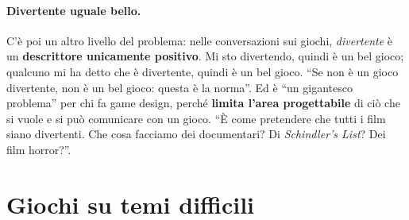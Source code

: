 \paragraph{Divertente uguale bello.} C'è poi un altro livello del problema:
nelle conversazioni sui giochi, \emph{divertente} è un \textbf{descrittore
unicamente positivo}. Mi sto divertendo, quindi è un bel gioco; qualcuno mi ha
detto che è divertente, quindi è un bel gioco. ``Se non è un gioco divertente, non
è un bel gioco: questa è la norma''. Ed è ``un gigantesco problema'' per chi fa game
design, perché \textbf{limita l'area progettabile} di ciò che si vuole e si può
comunicare con un gioco. ``È come pretendere che tutti i film siano divertenti. Che
cosa facciamo dei documentari? Di \emph{Schindler's List}? Dei film horror?''.

\section{Giochi su temi difficili}
\label{a5:sec:temi}



